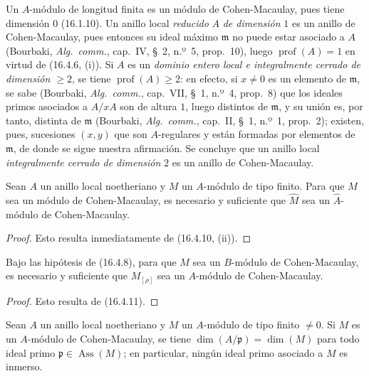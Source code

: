 Un $A$-módulo de longitud finita es un módulo de Cohen-Macaulay, pues tiene
dimensión $0$ (16.1.10). Un anillo local \emph{reducido} $A$ \emph{de dimensión} $1$ es un
anillo de Cohen-Macaulay, pues entonces su ideal máximo $\mathfrak{m}$ no puede
estar asociado a $A$ (Bourbaki, \emph{Alg.~comm.}, cap.~IV, \S~2, n.º~5,
prop.~10), luego $\operatorname{prof}(A)=1$ en virtud de (16.4.6, (i)). Si $A$
es un \emph{dominio entero local e integralmente cerrado de dimensión
$\geq2$}, se tiene $\operatorname{prof}(A)\geq2$: en efecto, si $x\neq0$ es un
elemento de $\mathfrak{m}$, se sabe (Bourbaki, \emph{Alg.~comm.}, cap.~VII,
\S~1, n.º~4, prop.~8) que los ideales primos asociados a $A/xA$ son de altura
$1$, luego distintos de $\mathfrak{m}$, y su unión es, por tanto, distinta de
$\mathfrak{m}$ (Bourbaki, \emph{Alg.~comm.}, cap.~II, \S~1, n.º~1,
prop.~2); existen, pues, sucesiones $(x,y)$ que son $A$-regulares y están
formadas por elementos de $\mathfrak{m}$, de donde se sigue nuestra afirmación.
Se concluye que un anillo local \emph{integralmente cerrado de dimensión} $2$ es un
anillo de Cohen-Macaulay.

\begin{proposition}[16.5.2]
\label{0.16.5.2-fr}
Sean $A$ un anillo local noetheriano y $M$ un $A$-módulo de tipo finito. Para
que $M$ sea un módulo de Cohen-Macaulay, es necesario y suficiente que
$\widehat M$ sea un $\widehat A$-módulo de Cohen-Macaulay.
\end{proposition}
\begin{proof}
Esto resulta inmediatamente de (16.4.10, (ii)).
\end{proof}

\begin{proposition}[16.5.3]
\label{0.16.5.3-fr}
Bajo las hipótesis de \textup{(16.4.8)}, para que $M$ sea un $B$-módulo de
Cohen-Macaulay, es necesario y suficiente que $M_{[\rho]}$ sea un $A$-módulo de
Cohen-Macaulay.
\end{proposition}

\begin{proof}
Esto resulta de (16.4.11).
\end{proof}

\begin{proposition}[16.5.4]
\label{0.16.5.4-fr}
Sean $A$ un anillo local noetheriano y $M$ un $A$-módulo de tipo finito $\neq0$.
Si $M$ es un $A$-módulo de Cohen-Macaulay, se tiene
$\dim(A/\mathfrak{p})=\dim(M)$ para todo ideal primo
$\mathfrak{p}\in\operatorname{Ass}(M)$; en particular, ningún ideal primo
asociado a $M$ es inmerso.
\end{proposition}

